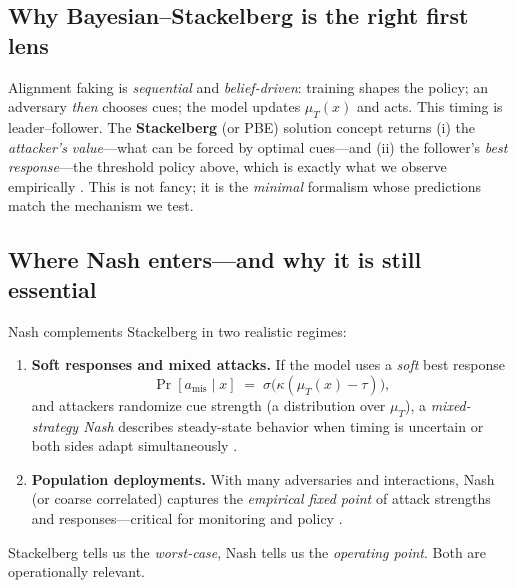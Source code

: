 \subsection*{Why \textbf{Bayesian--Stackelberg} is the right first lens}
Alignment faking is \emph{sequential} and \emph{belief-driven}: training shapes the policy; an adversary \emph{then} chooses cues; the model updates $\mu_T(x)$ and acts. This timing is leader--follower. The \textbf{Stackelberg} (or PBE) solution concept returns (i) the \emph{attacker’s value}—what can be forced by optimal cues—and (ii) the follower’s \emph{best response}—the threshold policy above, which is exactly what we observe empirically \citep{tambe2011security,korzhyk2011uncertain}.
This is not fancy; it is the \emph{minimal} formalism whose predictions match the mechanism we test.

\subsection*{Where \textbf{Nash} enters—and why it is still essential}
Nash complements Stackelberg in two realistic regimes:
\begin{enumerate}[leftmargin=1.75em,itemsep=0.25em]
  \item \textbf{Soft responses and mixed attacks.} If the model uses a \emph{soft} best response
  \[
  \Pr[a_{\text{mis}}\mid x]\;=\;\sigma\!\big(\kappa(\mu_T(x)-\tau)\big),
  \]
  and attackers randomize cue strength (a distribution over $\mu_T$), a \emph{mixed-strategy Nash} describes steady-state behavior when timing is uncertain or both sides adapt simultaneously \citep{nash1951noncooperative,brown1951iterative}.
  \item \textbf{Population deployments.} With many adversaries and interactions, Nash (or coarse correlated) captures the \emph{empirical fixed point} of attack strengths and responses—critical for monitoring and policy \citep{osborne2004game}.
\end{enumerate}
Stackelberg tells us the \emph{worst-case}, Nash tells us the \emph{operating point}. Both are operationally relevant.

